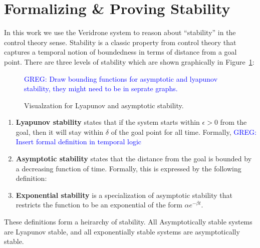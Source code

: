 \documentclass[preprint]{sigplanconf}
\newcommand{\greg}[1]{\textcolor{blue}{\textsc{GREG}: #1}}
\begin{document}




\section{Formalizing \& Proving Stability}

In this work we use the Veridrone system to reason about ``stability'' in the control theory sense.
Stability is a classic property from control theory that captures a temporal notion of boundedness in terms of distance from a goal point.
There are three levels of stability which are shown graphically in Figure~\ref{fig:stability}:
\begin{figure}[b]

\greg{Draw bounding functions for asymptotic and lyapunov stability, they might need to be in seprate graphs.}
%


\caption{Visualzation for Lyapunov and asymptotic stability.}
\label{fig:stability}
\end{figure}
\begin{enumerate}
\item \textbf{Lyapunov stability} states that if the system starts within $\epsilon > 0$ from the goal, then it will stay within $\delta$ of the goal point for all time.
Formally,
\greg{Insert formal definition in temporal logic}

\item \textbf{Asymptotic stability} states that the distance from the goal is bounded by a decreasing function of time.
Formally, this is expressed by the following definition:

\item \textbf{Exponential stability} is a specialization of asymptotic stability that restricts the function to be an exponential of the form $\alpha e^{-\beta t}$.

\end{enumerate}

These definitions form a heirarchy of stability.
All Asymptotically stable systems are Lyapunov stable, and all exponentially stable systems are asymptotically stable.
\end{document}
